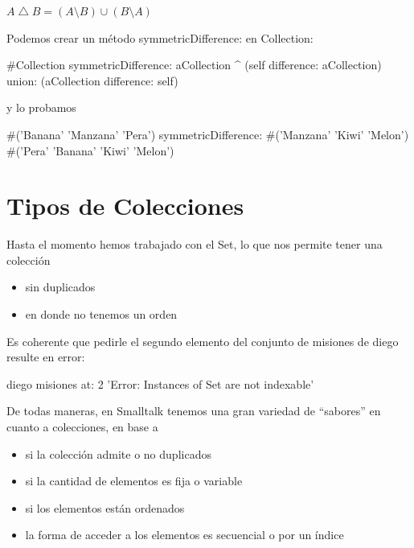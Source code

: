 \documentclass[a4paper,12pt]{book}
\begin{document}
\begin{mdframed}[style=BoxFrame]
\( A \bigtriangleup B = (A \setminus B) \cup (B \setminus A) \) 
\end{mdframed}

Podemos crear un método symmetricDifference: en Collection:

\begin{code}
#Collection
symmetricDifference: aCollection
	^ (self difference: aCollection) 
	     union: (aCollection difference: self)
\end{code}

y lo probamos

\begin{code}
#('Banana' 'Manzana' 'Pera') 
      symmetricDifference: #('Manzana' 'Kiwi' 'Melon')
      #('Pera' 'Banana' 'Kiwi' 'Melon')
\end{code}

\section{Tipos de Colecciones}
Hasta el momento hemos trabajado con el Set, lo que nos permite tener una colección

\begin{itemize}
 \item sin duplicados
 \item en donde no tenemos un orden
\end{itemize}

Es coherente que pedirle el segundo elemento del conjunto de misiones de diego resulte en error:

\begin{code}
diego misiones at: 2
  'Error: Instances of Set are not indexable'
\end{code}

\vspace{\baselineskip}
De todas maneras, en Smalltalk tenemos una gran variedad de ``sabores'' en cuanto a colecciones, en base a

\begin{itemize}
 \item si la colección admite o no duplicados
 \item si la cantidad de elementos es fija o variable
 \item si los elementos están ordenados
 \item la forma de acceder a los elementos es secuencial o por un índice
\end{itemize}
\end{document}
